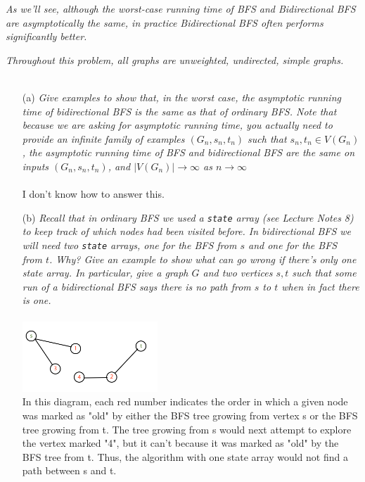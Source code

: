 \documentclass[12pt]{article} \setlength{\oddsidemargin}{0in}
\begin{document}
\textit{As we’ll see, although the worst-case running time of BFS and Bidirectional BFS are
asymptotically the same, in practice Bidirectional BFS often performs significantly
better.}

\textit{Throughout this problem, all graphs are unweighted, undirected, simple graphs.}
\\\\

\begin{enumerate}
\item[(a)]{\textit{Give examples to show that, in the worst case, the asymptotic running time of
bidirectional BFS is the same as that of ordinary BFS. Note that because we are
asking for asymptotic running time, you actually need to provide an infinite family
of examples $(G_n , s_n , t_n )$ such that $s_n, t_n \in V(G_n)$, the asymptotic running time of
BFS and bidirectional BFS are the same on inputs $(G_n, s_n, t_n)$, and $|V(G_n)| \rightarrow \infty$ as $n \rightarrow \infty$}}
  \\\\
  I don't know how to answer this.
  \\
  \pagebreak
\item[(b)]{\textit{Recall that in ordinary BFS we used a \texttt{state} array (see Lecture Notes 8) to keep track of which nodes had been visited before. In bidirectional BFS we will need two
\texttt{state} arrays, one for the BFS from $s$ and one for the BFS from $t$. Why? Give an
example to show what can go wrong if there’s only one state array. In particular,
give a graph $G$ and two vertices $s, t$ such that some run of a bidirectional BFS
says there is no path from $s$ to $t$ when in fact there is one.}}
  \\\\
  \includegraphics[width=0.4\textwidth]{P4-b} \\
  In this diagram, each red number indicates the order in which a given node was marked as "old" by either the BFS tree growing from vertex s or the BFS tree growing from t. The tree growing from s would next attempt to explore the vertex marked "4", but it can't because it was marked as "old" by the BFS tree from t. Thus, the algorithm with one state array would not find a path between s and t. 

\end{enumerate}
\end{document}
